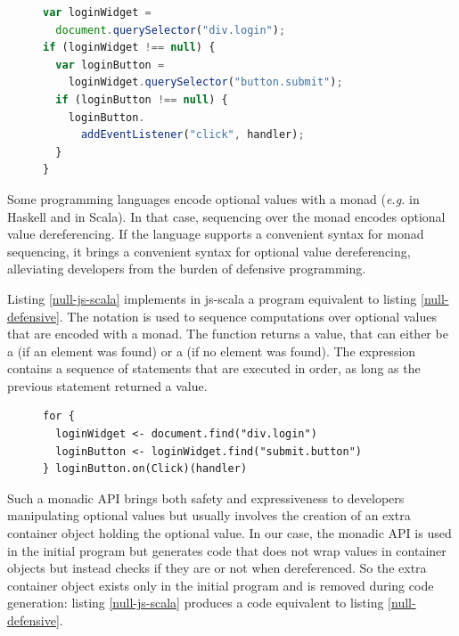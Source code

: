 \documentclass[preprint]{sigplanconf}
\newcommand{\eg}{\emph{e.g.}}
\begin{document}
\begin{figure}
\begin{lstlisting}[language=JavaScript,label=null-defensive,caption=Defensive programming to handle
null references]
var loginWidget =
  document.querySelector("div.login");
if (loginWidget !== null) {
  var loginButton =
    loginWidget.querySelector("button.submit");
  if (loginButton !== null) {
    loginButton.
      addEventListener("click", handler);
  }
}
\end{lstlisting}
\end{figure}

Some programming languages encode optional values with a monad (\eg {} in Haskell and
 in Scala). In that case, sequencing over the monad encodes optional value
dereferencing. If the language supports a convenient syntax for monad sequencing, it brings a
convenient syntax for optional value dereferencing, alleviating developers from the burden of
defensive programming.

Listing \ref{null-js-scala} implements in js-scala a program equivalent to listing
\ref{null-defensive}. The  notation is used to sequence computations over optional values
that are encoded with a monad. The  function returns a  value,
that can either be a  (if an element was found) or a 
(if no element was found). The  expression contains a sequence of statements that are
executed in order, as long as the previous statement returned a  value.

\begin{figure}
\begin{lstlisting}[label=null-js-scala,caption=Handling null references in js-scala]
for {
  loginWidget <- document.find("div.login")
  loginButton <- loginWidget.find("submit.button")
} loginButton.on(Click)(handler)
\end{lstlisting}
\end{figure}

Such a monadic API brings both safety and expressiveness to developers manipulating optional values
but usually involves the creation of an extra container object holding the optional value. In our
case, the monadic API is used in the initial program but generates code that does not wrap values in
container objects but instead checks if they are  or not when dereferenced. So the extra
container object exists only in the initial program and is removed during code generation: listing
\ref{null-js-scala} produces a code equivalent to listing
\ref{null-defensive}.
\end{document}
